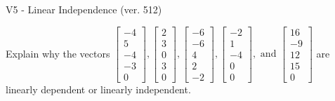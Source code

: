 \begin{exercise}
  \begin{exerciseTitle}V5 - Linear Independence (ver. 512)\end{exerciseTitle}
  \begin{exerciseStatement}
    Explain why the vectors \(\left[\begin{array}{r}
-4 \\
5 \\
-4 \\
-3 \\
0
\end{array}\right] , \left[\begin{array}{r}
2 \\
3 \\
0 \\
3 \\
0
\end{array}\right] , \left[\begin{array}{r}
-6 \\
-6 \\
4 \\
2 \\
-2
\end{array}\right] , \left[\begin{array}{r}
-2 \\
1 \\
-4 \\
0 \\
0
\end{array}\right] , \text{ and } \left[\begin{array}{r}
16 \\
-9 \\
12 \\
15 \\
0
\end{array}\right]\) are linearly dependent or linearly independent.	



\end{exerciseStatement}
\end{exercise}
